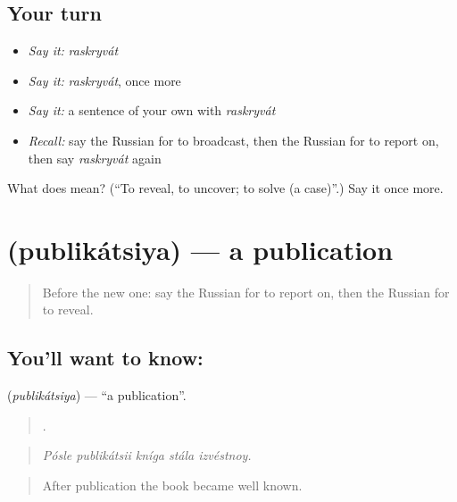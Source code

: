 \subsection*{Your turn}
\begin{itemize}
\raggedright
  \item \emph{Say it:} \emph{raskryvát}
  \item \emph{Say it:} \emph{raskryvát}, once more
  \item \emph{Say it:} a sentence of your own with \emph{raskryvát}
  \item \emph{Recall:} say the Russian for to broadcast, then the Russian for to report on, then say \emph{raskryvát} again
\end{itemize}

\begin{tcolorbox}[breakable,colback=teal!4,colframe=teal!35!black,title={Before you move on}]
What does  mean? (\textquotedblleft{}To reveal, to uncover; to solve (a case)\textquotedblright{}.) Say it once more.
\end{tcolorbox}
\section[\texorpdfstring{\ru{публикация} (publikátsiya)}{публикация (publikátsiya)}]{ (publikátsiya) — a publication}

\label{lesson:RU-C286-publikatsiya}



\begin{quote}
Before the new one: say the Russian for to report on, then the Russian for to reveal.
\end{quote}

\subsection*{You'll want to know: }
\textbf{} (\emph{publikátsiya}) — \textquotedblleft{}a publication\textquotedblright{}.

\begin{quote}
    .
\end{quote}

\begin{quote}
\emph{Pósle publikátsii kníga stála izvéstnoy.}
\end{quote}

\begin{quote}
After publication the book became well known.
\end{quote}

